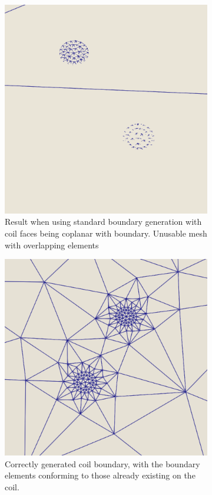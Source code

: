 \documentclass[12pt, letterpaper]{article}
\begin{document}
\begin{figure}[ht]
	\begin{subfigure}{0.48\textwidth}
		\includegraphics[width=\linewidth]{coplanarOverlap.png}
		\caption{Result when using standard boundary generation with coil faces being coplanar with boundary. Unusable mesh with overlapping elements}
	\end{subfigure}
	\hspace*{\fill}	
	\begin{subfigure}{0.48\textwidth}
		\includegraphics[width=\linewidth]{coplanarFixed.png}
		\caption{Correctly generated coil boundary, with the boundary elements conforming to those already existing on the coil.}
	\end{subfigure}	
	\caption{}
	\label{coilBoundaryFix}
\end{figure}
\end{document}
